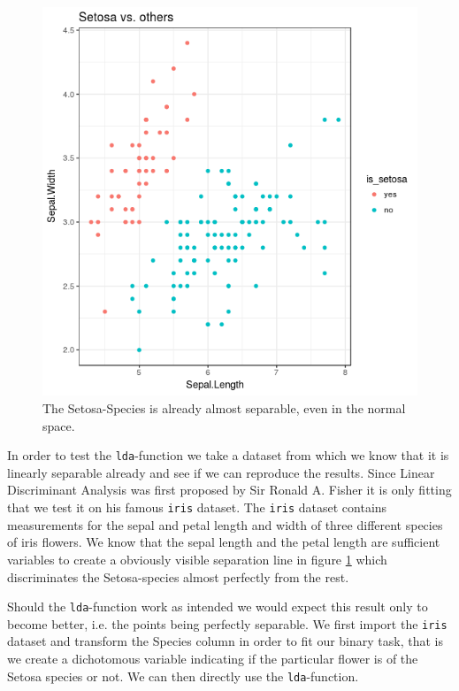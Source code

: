 \documentclass{article}
\begin{document}
\begin{figure}
\label{iris}
\begin{center}
\includegraphics[scale=0.3, trim={10mm 20mm 30mm 30mm}]{../LDA/iris.png}
\end{center}
\caption{The Setosa-Species is already almost separable, even in the normal space.}
\end{figure}


In order to test the \texttt{lda}-function we take a dataset from which we know that it is linearly separable already and see if we can reproduce the results. Since Linear Discriminant Analysis was first proposed by Sir Ronald A. Fisher it is only fitting that we test it on his famous \texttt{iris} dataset. The \texttt{iris} dataset contains measurements for the sepal and petal length and width of three different species of iris flowers. We know that the sepal length and the petal length are sufficient variables to create a obviously visible separation line in figure \ref{iris} which discriminates the Setosa-species almost perfectly from the rest. 

Should the \texttt{lda}-function work as intended we would expect this result only to become better, i.e. the points being perfectly separable. We first import the \texttt{iris} dataset and transform the Species column in order to fit our binary task, that is we create a dichotomous variable indicating if the particular flower is of the Setosa species or not. We can then directly use the \texttt{lda}-function.
\end{document}
